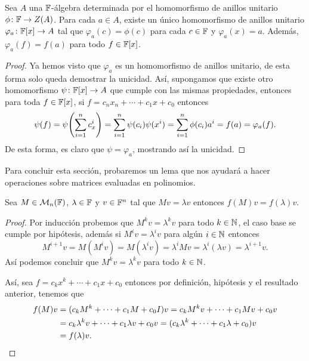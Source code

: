 \begin{prop}\label{prop:EvalPoly}
  Sea $A$ una $\mathbb{F}$-álgebra determinada por el homomorfismo de anillos unitario $\phi\colon \mathbb{F}\to Z(A)$. Para cada $a \in A$, existe un único homomorfismo de anillos unitario $\varphi_a \colon \mathbb{F}[x] \to A$ tal que $\varphi_a(c) = \phi(c)$ para cada $c \in \mathbb{F}$ y $\varphi_a(x) = a$. Además, $\varphi_a(f) = f(a)$ para todo $f \in \mathbb{F}[x]$.
\end{prop}
\begin{proof}
  Ya hemos visto que $\varphi_a$ es un homomorfismo de anillos unitario, de esta forma solo queda demostrar la unicidad. Así, supongamos que existe otro homomorfismo $\psi\colon \mathbb{F}[x] \to A$ que cumple con las mismas propiedades, entonces para toda $f \in \mathbb{F}[x]$, si $f = c_n x_n + \cdots+ c_1x + c_0$ entonces
  \[
    \psi(f) = \psi\paren{\sum_{i=1}^n c_x^i} = \sum_{i=1}^n \psi(c_i) \psi(x^i) = \sum_{i=1}^n \phi(c_i) a^i = f(a) = \varphi_a(f).
  \]
  De esta forma, es claro que $\psi = \varphi_a$, mostrando así la unicidad.
\end{proof}

Para concluir esta sección, probaremos un lema que nos ayudará a hacer operaciones sobre matrices evaluadas en polinomios. 

\begin{lema}
  Sea $M \in \mathcal{M}_n(\mathbb{F})$, $\lambda \in \mathbb{F}$ y $v \in \mathbb{F}^n$ tal que $Mv = \lambda v$ entonces $f(M) v = f(\lambda) v$.
\end{lema}
\begin{proof}
  Por inducción probemos que $M^k v = \lambda^k v$ para todo $k \in \mathbb{N}$, el caso base se cumple por hipótesis, además si $M^i v = \lambda^i v $ para algún $i\in \mathbb{N}$ entonces 
    \[
      M^{i+1}v = M(M^iv) = M (\lambda^i v) = \lambda^i Mv = \lambda^i(\lambda v) = \lambda^{i+1}v.
    \]
  Así podemos concluir que  $M^k v = \lambda^k v$ para todo $k \in \mathbb{N}$.

  Así, sea $f = c_k x^k + \cdots + c_1 x + c_0$ entonces por definición, hipótesis y el resultado anterior, tenemos que
  \begin{align*}
    f(M)v &= ( c_k M^k + \cdots + c_1 M + c_0I) v 
       = c_k M^kv + \cdots + c_1 Mv + c_0v \\
      &= c_k\lambda^k v + \cdots + c_1 \lambda v + c_0v 
       = (c_k\lambda^k + \cdots + c_1 \lambda + c_0 )v \\
      &= f(\lambda) v. \qedhere
  \end{align*}
\end{proof}